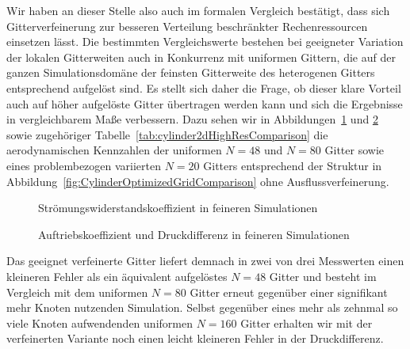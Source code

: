 \bigskip

Wir haben an dieser Stelle also auch im formalen Vergleich bestätigt, dass sich Gitterverfeinerung zur besseren Verteilung beschränkter Rechenressourcen einsetzen lässt.
Die bestimmten Vergleichswerte bestehen bei geeigneter Variation der lokalen Gitterweiten auch in Konkurrenz mit uniformen Gittern, die auf der ganzen Simulationsdomäne der feinsten Gitterweite des heterogenen Gitters entsprechend aufgelöst sind. Es stellt sich daher die Frage, ob dieser klare Vorteil auch auf höher aufgelöste Gitter übertragen werden kann und sich die Ergebnisse in vergleichbarem Maße verbessern.
Dazu sehen wir in Abbildungen~\ref{fig:cylinder2dHighResDragComparison} und \ref{fig:cylinder2dHighResLiftDeltapComparison} sowie zugehöriger Tabelle~\ref{tab:cylinder2dHighResComparison} die aerodynamischen Kennzahlen der uniformen \(N=48\) und \(N=80\) Gitter sowie eines problembezogen variierten \(N=20\) Gitters entsprechend der Struktur in Abbildung~\ref{fig:CylinderOptimizedGridComparison} ohne Ausflussverfeinerung.

\bigskip

\begin{figure}[H]
\centering

\caption{Strömungswiderstandskoeffizient in feineren Simulationen}
\label{fig:cylinder2dHighResDragComparison}
\end{figure}

\begin{figure}[H]
\centering

\caption{Auftriebskoeffizient und Druckdifferenz in feineren Simulationen}
\label{fig:cylinder2dHighResLiftDeltapComparison}
\end{figure}

Das geeignet verfeinerte Gitter liefert demnach in zwei von drei Messwerten einen kleineren Fehler als ein äquivalent aufgelöstes \(N=48\) Gitter und besteht im Vergleich mit dem uniformen \(N=80\) Gitter erneut gegenüber einer signifikant mehr Knoten nutzenden Simulation. Selbst gegenüber eines mehr als zehnmal so viele Knoten aufwendenden uniformen \(N=160\) Gitter erhalten wir mit der verfeinerten Variante noch einen leicht kleineren Fehler in der Druckdifferenz.

